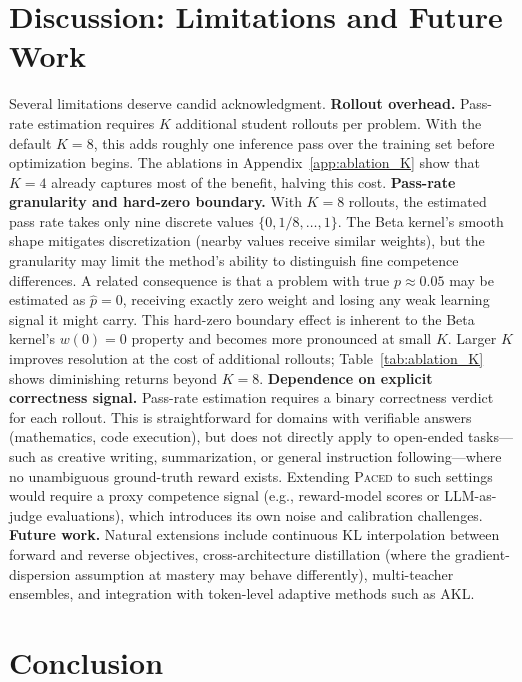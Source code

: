 \documentclass{article}
\begin{document}
\section{Discussion: Limitations and Future Work}
\label{sec:discussion}

Several limitations deserve candid acknowledgment.
\textbf{Rollout overhead.} Pass-rate estimation requires $K$ additional student rollouts per problem. With the default $K{=}8$, this adds roughly one inference pass over the training set before optimization begins. The ablations in Appendix~\ref{app:ablation_K} show that $K{=}4$ already captures most of the benefit, halving this cost.
\textbf{Pass-rate granularity and hard-zero boundary.} With $K{=}8$ rollouts, the estimated pass rate takes only nine discrete values $\{0, 1/8, \dots, 1\}$. The Beta kernel's smooth shape mitigates discretization (nearby values receive similar weights), but the granularity may limit the method's ability to distinguish fine competence differences. A related consequence is that a problem with true $p \approx 0.05$ may be estimated as $\hat{p}=0$, receiving exactly zero weight and losing any weak learning signal it might carry. This hard-zero boundary effect is inherent to the Beta kernel's $w(0)=0$ property and becomes more pronounced at small $K$. Larger $K$ improves resolution at the cost of additional rollouts; Table~\ref{tab:ablation_K} shows diminishing returns beyond $K{=}8$.
\textbf{Dependence on explicit correctness signal.} Pass-rate estimation requires a binary correctness verdict for each rollout. This is straightforward for domains with verifiable answers (mathematics, code execution), but does not directly apply to open-ended tasks---such as creative writing, summarization, or general instruction following---where no unambiguous ground-truth reward exists. Extending \textsc{Paced} to such settings would require a proxy competence signal (e.g., reward-model scores or LLM-as-judge evaluations), which introduces its own noise and calibration challenges.
\textbf{Future work.} Natural extensions include continuous KL interpolation between forward and reverse objectives, cross-architecture distillation (where the gradient-dispersion assumption at mastery may behave differently), multi-teacher ensembles, and integration with token-level adaptive methods such as AKL.
\section{Conclusion}
\end{document}
